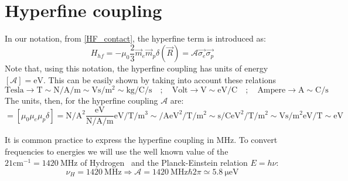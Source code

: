 \section{Hyperfine coupling}
\label{units_A}
In our notation, from \eqref{HF_contact}, the hyperfine term is introduced as:
\begin{equation}
  H_{hf} = -\mu_0\frac{2}{3} \vec{m}_e\vec{m}_p\delta(\vec{R}) = \mathcal{A}\vec{\sigma_e}\vec{\sigma_p}
\end{equation}
Note that, using this notation, the hyperfine coupling has units of energy $[\mathcal{A}]=\si{\eV}$. This can be easily shown by taking into account these relations
\begin{equation}
  \text{Tesla}\rightarrow\si{\tesla} \sim
  \si{\newton\per\ampere\per\m}\sim\si{\volt\s\per\m\squared} \sim
  \si{\kilogram\per\coulomb\per\s}  \quad;\quad
  \text{Volt}\rightarrow\si{\V}\sim\si{\eV\per\coulomb}  \quad;\quad
  \text{Ampere}\rightarrow\si{\ampere}\sim\si{\coulomb\per\s}
\end{equation}
The units, then, for the hyperfine coupling $\mathcal{A}$ are:
\begin{equation}
  [\mathcal{A}] = \left[\mu_0\mu_e\mu_p\delta\right] =
  \si{\newton\per\ampere\squared}\frac{\si{\eV}}{\si{\newton\per\ampere\per\m}}
  \si{\eV\per\tesla}\si{\per\m\cubed} \sim
  \si{\per\ampere}\si{\eV\squared\per\tesla}\si{\per\m\squared} \sim
  \si{\s\per\coulomb}\si{\eV\squared\per\tesla}\si{\per\m\squared} \sim
  \si{\V\s\per\m\squared}\si{\eV\per\tesla}\sim \si{\eV}
\end{equation}


It is common practice to express the hyperfine coupling in $\si{\MHz}$. To convert frequencies to energies we will use the well known value of the $21\si{\cm^{-1}}=\SI{1420}{\MHz}$ of Hydrogen~\cite{Hellwig1970} and the Planck-Einstein relation $E=h\nu$:
\begin{equation}
  \nu_H = \SI{1420}{\MHz} \Rightarrow \mathcal{A} = \SI{1420}{\MHz}\hbar2\pi\simeq
  \SI{5.8}{\micro\eV}
\end{equation}


